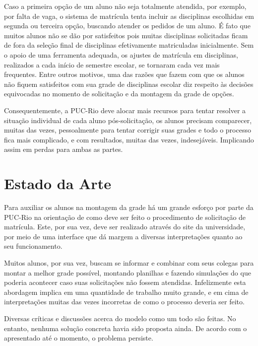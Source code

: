 \documentclass[graduacao,brazil]{ThesisPUC}
\begin{document}
Caso a primeira opção de um aluno não seja totalmente atendida, por exemplo, por falta de vaga, o sistema de matrícula tenta incluir as disciplinas escolhidas em segunda ou terceira opção, buscando atender os pedidos de um aluno. É fato que muitos alunos não se dão por satisfeitos pois muitas disciplinas solicitadas ficam de fora da seleção final de disciplinas efetivamente matriculadas inicialmente. Sem o apoio de uma ferramenta adequada, os ajustes de matrícula em disciplinas, realizados a cada início de semestre escolar, se tornaram cada vez mais frequentes. Entre outros motivos, uma das razões que fazem com que os alunos não fiquem satisfeitos com sua grade de disciplinas escolar diz respeito às decisões equivocadas no momento de solicitação e da montagem da grade de opções.

Consequentemente, a PUC-Rio deve alocar mais recursos para tentar resolver a situação individual de cada aluno pós-solicitação, os alunos precisam comparecer, muitas das vezes, pessoalmente para tentar corrigir suas grades e todo o processo fica mais complicado, e com resultados, muitas das vezes, indesejáveis. Implicando assim em perdas para ambas as partes.


\chapter{Estado da Arte}

Para auxiliar os alunos na montagem da grade há um grande esforço por parte da PUC-Rio na orientação de como deve ser feito o procedimento de solicitação de matrícula. Este, por sua vez, deve ser realizado através do site da universidade, por meio de uma interface que dá margem a diversas interpretações quanto ao seu funcionamento.

Muitos alunos, por sua vez, buscam se informar e combinar com seus colegas para montar a melhor grade possível, montando planilhas e fazendo simulações do que poderia acontecer caso suas solicitações não fossem atendidas. Infelizmente esta abordagem implica em uma quantidade de trabalho muito grande, e em cima de interpretações muitas das vezes incorretas de como o processo deveria ser feito.

Diversas críticas e discussões acerca do modelo como um todo são feitas. No entanto, nenhuma solução concreta havia sido proposta ainda. De acordo com o apresentado até o momento, o problema persiste.
\end{document}
